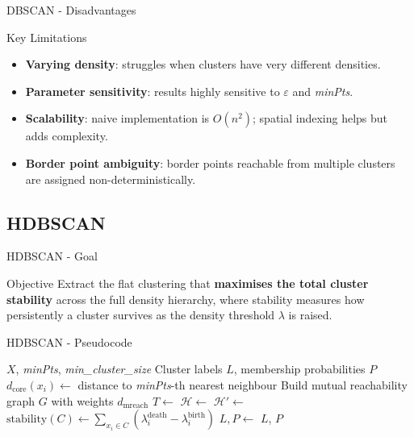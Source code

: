 \documentclass[aspectratio=169]{beamer}
\begin{document}
\begin{frame}{DBSCAN - Disadvantages}

    \begin{alertblock}{ Key Limitations}
    \begin{itemize}\small
        \item \textbf{Varying density}: struggles when clusters have very different densities.
        \item \textbf{Parameter sensitivity}: results highly sensitive to $\varepsilon$ and \textit{minPts}.
        \item \textbf{Scalability}: naive implementation is $O(n^2)$; spatial indexing helps but adds complexity.
        \item \textbf{Border point ambiguity}: border points reachable from multiple clusters are assigned non-deterministically.
    \end{itemize}
    \end{alertblock}

\end{frame}

\subsection{HDBSCAN}

\begin{frame}{HDBSCAN - Goal}
  \begin{block}{Objective}
    \centering\normalsize
    Extract the flat clustering that \textbf{maximises the total cluster stability} across the full density hierarchy, where stability measures how persistently a cluster survives as the density threshold $\lambda$ is raised.
  \end{block}
\end{frame}

\begin{frame}{HDBSCAN - Pseudocode}
  \begin{algorithm}[H]
    \footnotesize
    \caption{HDBSCAN}
    \begin{algorithmic}[1]
      \Require $X$, \textit{minPts}, \textit{min\_cluster\_size}
      \Ensure Cluster labels $L$, membership probabilities $P$
        \State $d_{\text{core}}(x_i) \leftarrow$ distance to \textit{minPts}-th nearest neighbour
      \EndFor
      \State Build mutual reachability graph $G$ with weights $d_{\text{mreach}}$
      \State $T \leftarrow$ 
      \State $\mathcal{H} \leftarrow$  
      \State $\mathcal{H}' \leftarrow$ 
        \State $\text{stability}(C) \leftarrow \sum_{x_i \in C}(\lambda_i^{\text{death}} - \lambda_i^{\text{birth}})$
      \EndFor
      \State $L, P \leftarrow$ 
      \Return $L$, $P$
    \end{algorithmic}
  \end{algorithm}
\end{frame}
\end{document}
